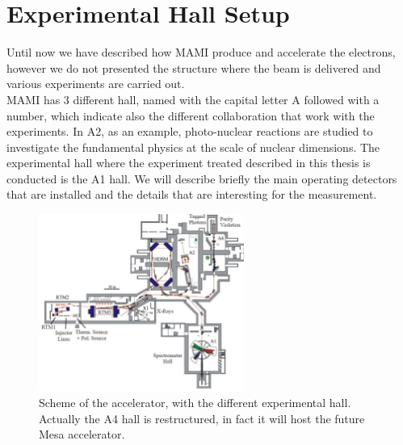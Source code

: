 \section{Experimental Hall Setup}


Until now we have described how MAMI produce and accelerate the electrons, however we do not presented the structure where the beam is delivered and various experiments are carried out. \\
MAMI has 3 different hall, named with the capital letter A followed with a number, which indicate also the different collaboration that work with the experiments. In A2, as an example, photo-nuclear reactions are studied to investigate the fundamental physics at the scale of nuclear dimensions. The experimental hall where the experiment treated described in this thesis is conducted is the A1 hall. We will describe briefly the main operating detectors that are installed and the details that are interesting for the \transv measurement. \bigskip

\begin{figure}[hbtp]
\centering
\includegraphics[width = 0.6\textwidth]{ExperimentalSetup/Accelerator.pdf}
\caption{Scheme of the accelerator, with the different experimental hall. Actually the A4 hall is restructured, in fact it will host the future Mesa accelerator.}
\label{fig:Accelerator}
\end{figure}

